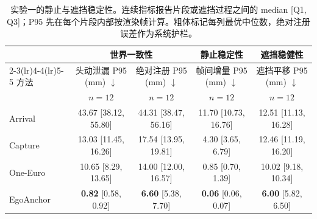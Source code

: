 \begin{table}[t]
\centering
\caption{实验一的静止与遮挡稳定性。连续指标报告片段或遮挡过程之间的 median [Q1, Q3]；P95 先在每个片段内部按渲染帧计算。粗体标记每列最优中位数，绝对注册误差作为系统护栏。}
\label{tab:exp1-static}
\small
\setlength{\tabcolsep}{4.0pt}
\renewcommand{\arraystretch}{1.14}
\begin{tabular}{lcccc}
\toprule
& \multicolumn{2}{c}{世界一致性} & 静止稳定性 & 遮挡稳健性 \\
\cmidrule(lr){2-3}\cmidrule(lr){4-4}\cmidrule(lr){5-5}
方法 & 头动泄漏 P95 (mm) $\downarrow$ & 绝对注册 P95 (mm) $\downarrow$ & 帧间增量 P95 (mm) $\downarrow$ & 遮挡平移 P95 (mm) $\downarrow$ \\
& $n=12$ & $n=12$ & $n=12$ & $n=12$ \\
\midrule
Arrival & 43.67 [38.12, 55.80] & 44.31 [38.47, 56.16] & 11.70 [10.73, 16.76] & 12.51 [11.13, 16.28] \\
Capture & 13.03 [11.45, 16.26] & 17.54 [13.95, 19.81] & 4.30 [3.65, 6.79] & 12.46 [11.19, 16.20] \\
One-Euro & 10.65 [8.29, 13.65] & 14.00 [12.00, 16.57] & 0.85 [0.70, 1.39] & 10.02 [9.18, 10.34] \\
EgoAnchor & \textbf{0.82} [0.58, 0.92] & \textbf{6.60} [5.38, 7.70] & \textbf{0.06} [0.06, 0.07] & \textbf{6.00} [5.82, 6.50] \\
\bottomrule
\end{tabular}
\end{table}

